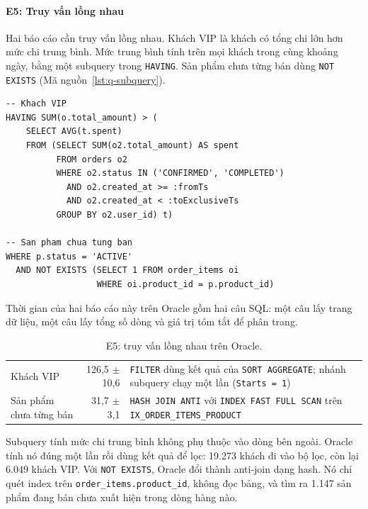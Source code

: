 \paragraph{E5: Truy vấn lồng nhau}\label{sec:q-e5}

Hai báo cáo cần truy vấn lồng nhau. Khách VIP là khách có tổng chi lớn hơn mức chi trung bình. Mức trung bình tính trên mọi khách trong cùng khoảng ngày, bằng một subquery trong \texttt{HAVING}. Sản phẩm chưa từng bán dùng \texttt{NOT EXISTS} (Mã nguồn~\ref{lst:q-subquery}).

\reportblockspace{72pt}
\begin{lstlisting}[language=OracleSQL,caption={Phần lồng nhau của hai báo cáo khách VIP và sản phẩm chưa từng bán.},label={lst:q-subquery}]
-- Khach VIP
HAVING SUM(o.total_amount) > (
    SELECT AVG(t.spent)
    FROM (SELECT SUM(o2.total_amount) AS spent
          FROM orders o2
          WHERE o2.status IN ('CONFIRMED', 'COMPLETED')
            AND o2.created_at >= :fromTs
            AND o2.created_at < :toExclusiveTs
          GROUP BY o2.user_id) t)

-- San pham chua tung ban
WHERE p.status = 'ACTIVE'
  AND NOT EXISTS (SELECT 1 FROM order_items oi
                  WHERE oi.product_id = p.product_id)
\end{lstlisting}

Thời gian của hai báo cáo này trên Oracle gồm hai câu SQL: một câu lấy trang dữ liệu, một câu lấy tổng số dòng và giá trị tóm tắt để phân trang.

\begin{table}[!htbp]
\centering
\caption{E5: truy vấn lồng nhau trên Oracle.}\label{tab:q-subquery}
\reporttablesetup
\begin{tabularx}{\linewidth}{|P{3.4cm}|r|L|}
\hline
{}
 &  &  \\ \hline
Khách VIP & 126,5 $\pm$ 10,6 & \texttt{FILTER} dùng kết quả của \texttt{SORT AGGREGATE}; nhánh subquery chạy một lần (\texttt{Starts = 1}) \\ \hline
Sản phẩm chưa từng bán & 31,7 $\pm$ 3,1 & \texttt{HASH JOIN ANTI} với \texttt{INDEX FAST FULL SCAN} trên \texttt{IX\_ORDER\_ITEMS\_PRODUCT} \\ \hline
\end{tabularx}
\end{table}

Subquery tính mức chi trung bình không phụ thuộc vào dòng bên ngoài. Oracle tính nó đúng một lần rồi dùng kết quả để lọc: 19.273 khách đi vào bộ lọc, còn lại 6.049 khách VIP. Với \texttt{NOT EXISTS}, Oracle đổi thành anti-join dạng hash. Nó chỉ quét index trên \texttt{order\_items.product\_id}, không đọc bảng, và tìm ra 1.147 sản phẩm đang bán chưa xuất hiện trong dòng hàng nào.

